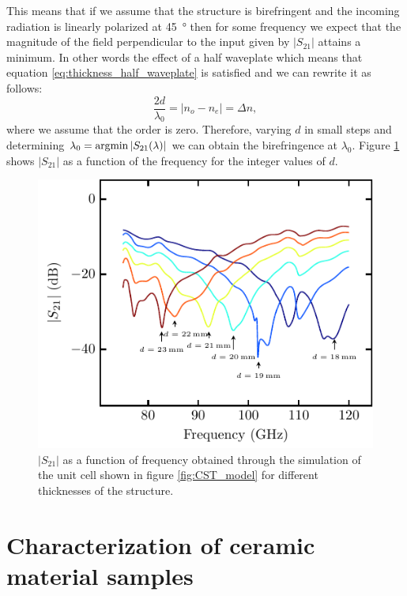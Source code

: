This means that if we assume that the structure is birefringent and the incoming radiation is linearly polarized at \SI{45}{\degree} then for some frequency we expect that the magnitude of the field perpendicular to the input given by $|S_{21}|$ attains a minimum. In other words the effect of a half waveplate which means that equation \ref{eq:thickness_half_waveplate} is satisfied and we can rewrite it as follows:
\begin{equation}
    \frac{2d}{\lambda_0}=|n_o-n_e|=\Delta n,
\end{equation}
where we assume that the order is zero. Therefore, varying $d$ in small steps and determining $\lambda_0=\operatorname*{\arg\!\min}|S_{21}(\lambda)|$ we can obtain the birefringence at $\lambda_0$. Figure \ref{fig:bf_sim} shows $|S_{21}|$ as a function of the frequency for the integer values of $d$.

\begin{figure}[H]
    \centering
    \includegraphics[scale=1]{images/appendix/plots/cst_sim/bf_sim.pdf}
    \caption{$|S_{21}|$ as a function of frequency obtained through the simulation of the unit cell shown in figure \ref{fig:CST_model} for different thicknesses of the structure.}
    \label{fig:bf_sim}
\end{figure}

\chapter{Characterization of ceramic material samples}
\label{sec:ceramic_characterization}
